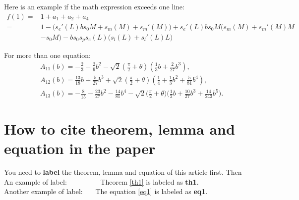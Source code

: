 \documentclass{jaac}
\begin{document}

Here is an example if the math expression exceeds one line:
\begin{align}
f(1)=&1 + a_1 + a_2 + a_4 \nonumber\\
=&1-\Big(s_e'(L)bs_0M + s_m(M)+s_m'(M)\Big)
+s_e'(L)bs_0M \Big(s_m(M)+s_m'(M)M\nonumber\\
&-s_0M\Big) - b s_0 s_ps_e(L)\Big(s_l(L)+s_l'(L)L\Big)
\end{align}

For more than one equation:
\begin{align}
&A_{11}(b)=-\frac{2}{3}-\frac{2}{9}b^2-\sqrt 2\left(\frac{\pi}{2}+\theta\right)\left(\frac{1}{3}b+\frac{2}{27}b^3\right),\nonumber\\
&A_{12}(b)=\frac{13}{18}b+\frac{5}{27}b^3+\sqrt2\left(\frac{\pi}{2}+\theta\right)\left(\frac{1}{4}+\frac{1}{3}b^2+\frac{5}{81}b^4\right),\label{eq1}\\
&A_{13}(b)=-\frac{8}{15}-\frac{23}{27}b^2-\frac{14}{81}b^4-\sqrt2\Big(\frac{\pi}{2}+\theta\Big)\Big(\frac{1}{2}b+\frac{10}{27}b^3+\frac{14}{243}b^5\Big). \nonumber
\end{align}


\section{How to cite theorem, lemma and equation in the paper}

You need to {\bf label} the theorem, lemma and equation of this article first. Then \\

An example of label: ~~~~~~~~~Theorem \ref{th1} is labeled as {\bf th1}. \\

Another example of label: ~~~The equation \eqref{eq1} is labeled as {\bf eq1}.
\end{document}
